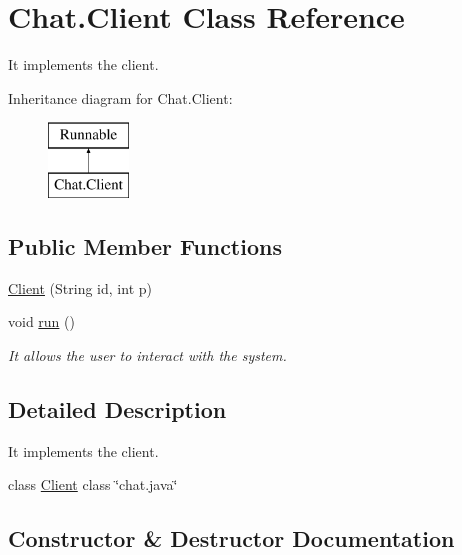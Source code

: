 \hypertarget{class_chat_1_1_client}{}\section{Chat.\+Client Class Reference}
\label{class_chat_1_1_client}


It implements the client.  


Inheritance diagram for Chat.\+Client\+:\begin{figure}[H]
\begin{center}
\leavevmode
\includegraphics[height=2.000000cm]{class_chat_1_1_client}
\end{center}
\end{figure}
\subsection*{Public Member Functions}
\begin{DoxyCompactItemize}
\item 
\hyperlink{class_chat_1_1_client_a4d66bd0f3bc141314127bc43806cbe6e}{Client} (String id, int p)
\item 
void \hyperlink{class_chat_1_1_client_af929f8bd324136e11afe64c92fa1cac3}{run} ()
\begin{DoxyCompactList}\small\item\em It allows the user to interact with the system. \end{DoxyCompactList}\end{DoxyCompactItemize}


\subsection{Detailed Description}
It implements the client. 

class \hyperlink{class_chat_1_1_client}{Client} class \char`\"{}chat.\+java\char`\"{} 

\subsection{Constructor \& Destructor Documentation}
\hypertarget{class_chat_1_1_client_a4d66bd0f3bc141314127bc43806cbe6e}{}\label{class_chat_1_1_client_a4d66bd0f3bc141314127bc43806cbe6e} 
